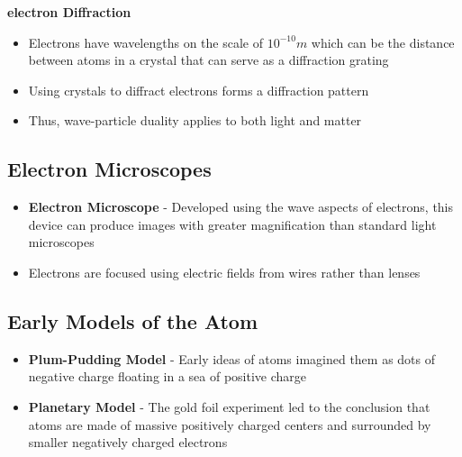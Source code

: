 \textbf{electron Diffraction}
\begin{itemize}
    \item Electrons have wavelengths on the scale of \(10^{-10}m\) which can be the distance between atoms in a crystal that can serve as a diffraction grating
    \item Using crystals to diffract electrons forms a diffraction pattern
    \item Thus, wave-particle duality applies to both light and matter
\end{itemize}

\subsection{Electron Microscopes}
\begin{itemize}
    \item \textbf{Electron Microscope} - Developed using the wave aspects of electrons, this device can produce images with greater magnification than standard light microscopes
    \item Electrons are focused using electric fields from wires rather than lenses
\end{itemize}

\subsection{Early Models of the Atom}
\begin{itemize}
    \item \textbf{Plum-Pudding Model} - Early ideas of atoms imagined them as dots of negative charge floating in a sea of positive charge
    \item \textbf{Planetary Model} - The gold foil experiment led to the conclusion that atoms are made of massive positively charged centers and surrounded by smaller negatively charged electrons
\end{itemize}

